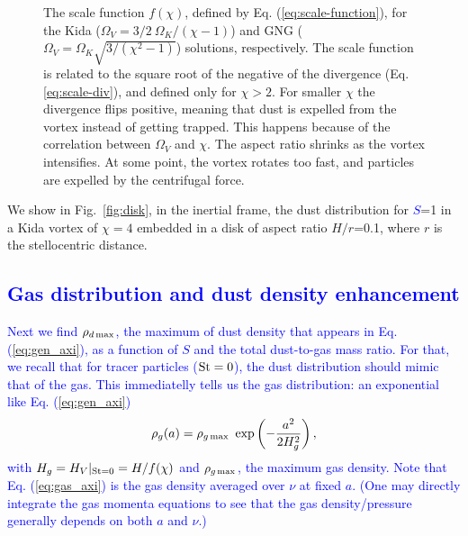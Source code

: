 \documentclass[apj]{emulateapj}
\def\blue#1{\textcolor{blue}{#1}}
\newcommand{\Eq}[1]{Eq. (\ref{#1})}
\newcommand{\eq}[1]{\Eq{#1}}
\newcommand{\eqp}[1]{(Eq. \ref{#1})}
\newcommand{\Fig}[1]{Fig.~\ref{#1}}
\newcommand{\fig}[1]{\Fig{#1}}
\newcommand{\beq}{\begin{equation}}
\newcommand{\eeq}{\end{equation}}
\newcommand{\St}{{\rm St}}
\begin{document}
\begin{figure}
  \begin{center}
  \end{center}
\caption[]{The scale function $f(\chi)$, defined by
  \eq{eq:scale-function}, for the Kida ($\varOmega_V=3/2
  \ \varOmega_K/(\chi-1)$) and GNG ($\varOmega_V=\varOmega_K
  \sqrt{3/(\chi^2-1)}$) solutions, respectively. The scale function is
  related to the square root of the negative of the divergence
  \eqp{eq:scale-div}, and defined only for $\chi>2$. For smaller $\chi$ the
  divergence flips positive, meaning that dust is expelled from the
  vortex instead of getting trapped. This happens because of the
  correlation between $\varOmega_V$ and $\chi$. The aspect ratio shrinks
  as the vortex intensifies. At some point, the vortex rotates too
  fast, and particles are expelled by the centrifugal force.}
 \label{fig:scale-function}
\end{figure}

We show in \fig{fig:disk}, in the inertial frame, 
the dust distribution for \blue{$S$}=1 in a Kida vortex of $\chi=4$ embedded in a 
disk of aspect ratio $H/r$=0.1, where $r$ is the stellocentric
distance. 

\blue{\subsection{Gas distribution and dust density enhancement}}

\blue{Next we find $\rho_{d\,{\rm max}}$, the maximum of dust
  density that appears in \eq{eq:gen_axi}, as a function
  of $S$ and the total dust-to-gas mass ratio. 
  For that, we recall that for tracer particles ($\St=0$), the dust distribution should
  mimic that of the gas. This immediatelly tells us the gas
  distribution: an exponential like \eq{eq:gen_axi}
\beq
\rho_g(a) = \rho_{g\,{\rm max}} \ \exp\left(-\frac{a^2}{2H_g^2}\right), \label{eq:gas_axi}
\eeq
\noindent with $H_g = {H_V}{\vert_{\St=0}} = H/f(\chi)$ and
$\rho_{g\,{\rm max}}$, the maximum gas density.  Note that 
\eq{eq:gas_axi} is the gas density averaged over $\nu$ at fixed $a$.  (One may  
directly integrate the gas momenta equations to see that the gas density/pressure generally depends on
both $a$ and $\nu$.) 
}
\end{document}
